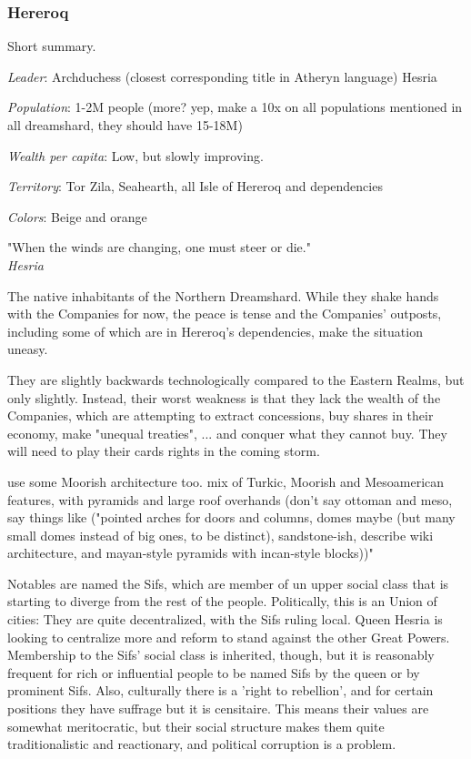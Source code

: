 \subsubsection{Hereroq}


Short summary.


\textit{Leader}: Archduchess (closest corresponding title in Atheryn language) Hesria

\textit{Population}: 1-2M people (more? yep, make a 10x on all populations mentioned in all dreamshard, they should have 15-18M)

\textit{Wealth per capita}: Low, but slowly improving.

\textit{Territory}: Tor Zila, Seahearth, all Isle of Hereroq and dependencies
    
\textit{Colors}: Beige and orange


\begin{rpg-quotebox}
    "When the winds are changing, one must steer or die." \\ \textendash \textit{Hesria}
    \end{rpg-quotebox}


The native inhabitants of the Northern Dreamshard. While they shake hands with the Companies for now, the peace is tense and the Companies' outposts, including some of which are in Hereroq's dependencies, make the situation uneasy.


They are slightly backwards technologically compared to the Eastern Realms, but only slightly. Instead, their worst weakness is that they lack the wealth of the Companies, which are attempting to extract concessions, buy shares in their economy, make "unequal treaties", ... and conquer what they cannot buy. They will need to play their cards rights in the coming storm. 

use some Moorish architecture too. mix of Turkic, Moorish and Mesoamerican features, with pyramids and large roof overhands (don't say ottoman and meso, say things like ("pointed arches for doors and columns, domes maybe (but many small domes instead of big ones, to be distinct), sandstone-ish, describe wiki architecture, and mayan-style pyramids with incan-style blocks))"

Notables are named the Sifs, which are member of un upper social class that is starting to diverge from the rest of the people. Politically, this is an Union of cities: They are quite decentralized, with the Sifs ruling local. Queen Hesria is looking to centralize more and reform to stand against the other Great Powers. Membership to the Sifs' social class is inherited, though, but it is reasonably frequent for rich or influential people to be named Sifs by the queen or by prominent Sifs. Also, culturally there is a 'right to rebellion', and for certain positions they have suffrage but it is censitaire. This means their values are somewhat meritocratic, but their social structure makes them quite traditionalistic and reactionary, and political corruption is a problem.

